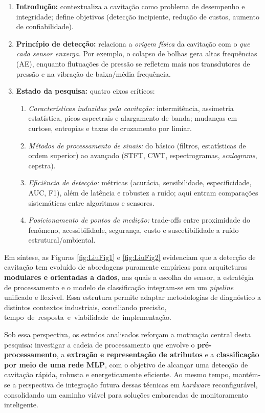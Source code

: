\linespread{1.27}\selectfont
\begin{enumerate}
    \item \textbf{Introdução:} contextualiza a cavitação como problema de desempenho e integridade; define objetivos (detecção incipiente, redução de custos, aumento de confiabilidade).
    \item \textbf{Princípio de detecção:} relaciona a \textit{origem física} da cavitação com o \textit{que cada sensor enxerga}. Por exemplo, o colapso de bolhas gera altas frequências (AE), enquanto flutuações de pressão se refletem mais nos transdutores de pressão e na vibração de baixa/média frequência.
    \item \textbf{Estado da pesquisa:} quatro eixos críticos:
    \begin{enumerate}[label=\alph*)]
        \item \textit{Características induzidas pela cavitação:} intermitência, assimetria estatística, picos espectrais e alargamento de banda; mudanças em curtose, entropias e taxas de cruzamento por limiar.
        \item \textit{Métodos de processamento de sinais:} do básico (filtros, estatísticas de ordem superior) ao avançado (STFT, CWT, espectrogramas, \textit{scalograms}, cepstra).
        \item \textit{Eficiência de detecção:} métricas (acurácia, sensibilidade, especificidade, AUC, F1), além de latência e robustez a ruído; aqui entram comparações sistemáticas entre algoritmos e sensores.
        \item \textit{Posicionamento de pontos de medição:} trade-offs entre proximidade do fenômeno, acessibilidade, segurança, custo e suscetibilidade a ruído estrutural/ambiental.
    \end{enumerate}
\end{enumerate}


Em síntese, as Figuras \ref{fig:LiuFig1} e \ref{fig:LiuFig2} evidenciam que a detecção de cavitação tem evoluído de abordagens puramente empíricas para arquiteturas \textbf{modulares e orientadas a dados}, nas quais a escolha do sensor, a estratégia de processamento e o modelo de classificação integram-se em um \textit{pipeline} unificado e flexível. Essa estrutura permite adaptar metodologias de diagnóstico a distintos contextos industriais, conciliando precisão, \mbox{tempo de resposta e viabilidade de implementação.}

Sob essa perspectiva, os estudos analisados reforçam a motivação central desta pesquisa: investigar a cadeia de processamento que envolve o \textbf{pré-processamento}, a \textbf{extração e representação de atributos} e a \textbf{classificação por meio de uma rede MLP}, com o objetivo de alcançar uma detecção de cavitação rápida, robusta e energeticamente eficiente. Ao mesmo tempo, mantém-se a perspectiva de integração futura dessas técnicas em \textit{hardware} reconfigurável, consolidando um caminho viável para soluções embarcadas de monitoramento inteligente.


